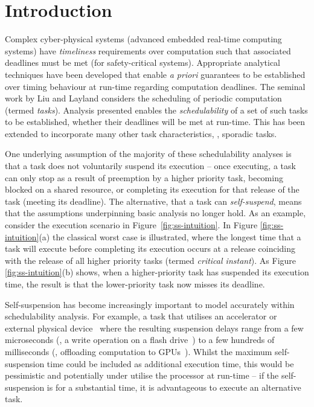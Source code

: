 \section{Introduction}

Complex cyber-physical systems (\ie advanced embedded real-time computing systems) have \emph{timeliness} requirements over computation such that associated deadlines must be met (\eg for safety-critical systems). Appropriate analytical techniques have been developed that enable \emph{a priori} guarantees to be established over timing behaviour at run-time regarding computation deadlines.  
The seminal work by Liu and Layland \cite{Liu_1973} considers the scheduling of periodic computation (termed \emph{tasks}). 
Analysis presented enables the \emph{schedulability} of a set of such tasks to be established, \ie whether their deadlines will be met at run-time. This has been extended to incorporate many other task characteristics, \eg, sporadic tasks\cite{Mok:1983:FDP:888951}. 

One underlying assumption of the majority of these schedulability analyses is that a task does not voluntarily suspend its execution -- once executing, a task can only stop as a result of preemption by a higher priority task, becoming blocked on a shared resource, or completing its execution for that release of the task (\ie meeting its deadline). The alternative, that a task can \emph{self-suspend}, means that the assumptions underpinning basic analysis no longer hold. As an example, consider the execution scenario in Figure~\ref{fig:ss-intuition}. In Figure \ref{fig:ss-intuition}(a) the classical worst case is illustrated, where the longest time that a task will execute before completing its execution occurs at a release coinciding with the release of all higher priority tasks (termed \emph{critical instant}). As Figure \ref{fig:ss-intuition}(b) shows, when a higher-priority task  has suspended its execution time, the result is that the lower-priority task now misses its deadline.


Self-suspension has become increasingly important to model accurately within schedulability analysis. For example, a task that utilises an accelerator or external physical device~\cite{Kang:rtss07,Kato_2011} where the resulting suspension delays range from a few microseconds (\eg, a write operation on a flash drive~\cite{Kang:rtss07}) to a few hundreds of milliseconds (\eg, offloading computation to GPUs~\cite{Kato_2011,Liu_2014}).  Whilst the maximum self-suspension time could be included as additional execution time, this would be pessimistic and potentially under utilise the processor at run-time -- if the self-suspension is for a substantial time, it is advantageous to execute an alternative task.

